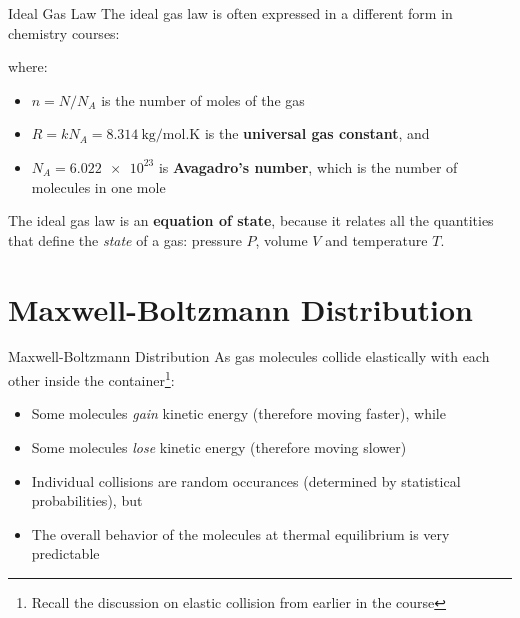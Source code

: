 \documentclass[12pt,aspectratio=169]{beamer}
\newcommand{\eq}[2]{\vspace{#1}{\Large\begin{displaymath}#2\end{displaymath}}}
\begin{document}
\begin{frame}{Ideal Gas Law}
  The ideal gas law is often expressed in a different form in chemistry
  courses:  

  \eq{-.25in}{
    \boxed{PV=nRT}
  }

  \vspace{-.2in}where:
  \begin{itemize}
  \item $n=N/N_A$ is the number of moles of the gas
  \item $R=kN_A=\SI{8.314}{\kilo\gram/\mol.\kelvin}$ is the
    \textbf{universal gas constant}, and
  \item $N_A=\num{6.022e23}$ is \textbf{Avagadro's number}, which is the number
    of molecules in one mole
  \end{itemize}

  \vspace{.1in}The ideal gas law is an \textbf{equation of state}, because it
  relates all the quantities that define the \emph{state} of a gas: pressure
  $P$, volume $V$ and temperature $T$.
\end{frame}



\section{Maxwell-Boltzmann Distribution}

\begin{frame}{Maxwell-Boltzmann Distribution}
  As gas molecules collide elastically with each other inside the
  container\footnote{Recall the discussion on elastic collision from earlier in
    the course}:
  \begin{itemize}
  \item Some molecules \emph{gain} kinetic energy (therefore moving faster),
    while
  \item Some molecules \emph{lose} kinetic energy (therefore moving slower)
  \item Individual collisions are random occurances (determined by statistical
    probabilities), but
  \item The overall behavior of the molecules at thermal equilibrium is very
    predictable
  \end{itemize}
\end{frame}
\end{document}
